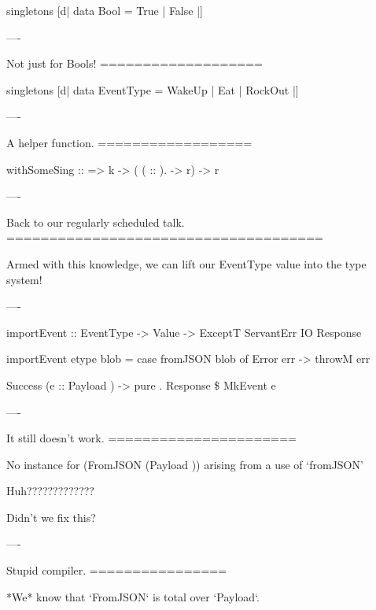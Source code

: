\begin{hs}
  singletons [d|
    data Bool = True
              | False
    |]
\end{hs}

----

Not just for Bools!
===================

\begin{hs}
  singletons [d|
    data EventType = WakeUp
                   | Eat
                   | RockOut
    |]
\end{hs}

----

A helper function.
==================

\begin{custom}
  withSomeSing ::  
               => k
               -> ( ( :: ).   -> r)
               -> r
\end{custom}

----

Back to our regularly scheduled talk.
=====================================

Armed with this knowledge, we can lift our EventType value into the type system!

----

\begin{raw}
  importEvent :: EventType
              -> Value
              -> ExceptT ServantErr IO Response

  importEvent etype blob =
      case fromJSON blob of
        Error err ->
          throwM err

        Success (e :: Payload ) ->
          pure . Response \$ MkEvent e
\end{raw}

----

It still doesn't work.
======================

\begin{error}
  No instance for (FromJSON (Payload ))
    arising from a use of `fromJSON'
\end{error}

Huh?????????????

Didn't we fix this?

----

Stupid compiler.
================

*We* know that `FromJSON` is total over `Payload`.

